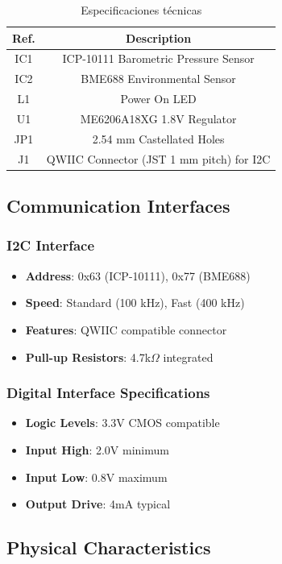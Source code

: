 \documentclass[11pt,a4paper]{article}
\begin{document}
\begin{table}[H]
\centering
\small
\begin{tabular}{|c|c|}
\hline
Ref. & Description \\
\hline
IC1 & ICP-10111 Barometric Pressure Sensor \\
IC2 & BME688 Environmental Sensor \\
L1 & Power On LED \\
U1 & ME6206A18XG 1.8V Regulator \\
JP1 & 2.54 mm Castellated Holes \\
J1 & QWIIC Connector (JST 1 mm pitch) for I2C \\
\hline
\end{tabular}
\caption{Especificaciones técnicas}
\end{table}


\subsection{Communication Interfaces}

\subsubsection{I2C Interface}
\begin{itemize}
\item \textbf{Address}: 0x63 (ICP-10111), 0x77 (BME688)
\item \textbf{Speed}: Standard (100 kHz), Fast (400 kHz)
\item \textbf{Features}: QWIIC compatible connector
\item \textbf{Pull-up Resistors}: 4.7k$\Omega$ integrated
\end{itemize}

\subsubsection{Digital Interface Specifications}
\begin{itemize}
\item \textbf{Logic Levels}: 3.3V CMOS compatible
\item \textbf{Input High}: 2.0V minimum
\item \textbf{Input Low}: 0.8V maximum
\item \textbf{Output Drive}: 4mA typical
\end{itemize}

\subsection{Physical Characteristics}
\end{document}
